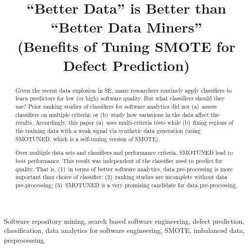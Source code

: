 \documentclass[10pt,conference]{IEEEtran}
\theoremstyle{break}
\theoremstyle{break}
\newcommand{\sma}{{\sc SMOTE}}
\newcommand{\smb}{{\sc SMOTUNED}}
\begin{document}
\pagestyle{plain}

\title{``Better Data'' is Better than ``Better Data Miners''\\ (Benefits of Tuning SMOTE for Defect Prediction) }

\maketitle






\begin{abstract}
Given the recent data explosion in SE, many researchers routinely  apply classifiers to
learn predictors for low (or high) software quality. But what classifiers should they use?
Prior  
  ranking studies of   classifiers   for
software analytics    did  not (a)~assess classifiers on multiple   criteria;
or  
(b)~study  how variations in the  data affect the results. 
Accordingly, this paper (a)~uses  multi-criteria tests while (b)~fixing regions of the training
 data with a weak signal via synthetic data generation (using {\smb}, which is a self-tuning version of {\sma}).

Over multiple data sets and  classifiers and performance  criteria,  {\smb}
lead to best performance. This result was independent of the  classifier used to
predict for quality.
That is, (1)~in terms of better software analytics, data
pre-processing is more important than  choice of classifier;
(2)~ranking studies  are  incomplete  without
data pre-processing;
(3)~{\smb} is a very promising candidate for data pre-processing.

\end{abstract}


\begin{IEEEkeywords}
Software repository mining, 
search based software engineering,
defect prediction, classification, 
data analytics for software engineering, SMOTE,  imbalanced data, preprocessing
\end{IEEEkeywords}
\end{document}
